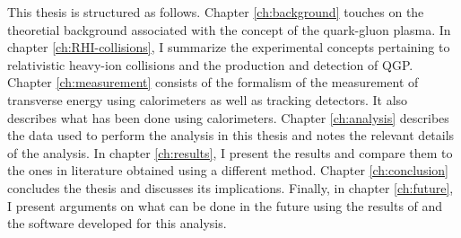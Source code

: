 This thesis is structured as follows. Chapter \ref{ch:background} touches on the theoretial background associated with the concept of the quark-gluon plasma. In chapter \ref{ch:RHI-collisions}, I summarize the experimental concepts pertaining to relativistic heavy-ion collisions and the production and detection of QGP. Chapter \ref{ch:measurement} consists of the formalism of the measurement of transverse energy using calorimeters as well as tracking detectors. It also describes what has been done using calorimeters. Chapter \ref{ch:analysis} describes the data used to perform the analysis in this thesis and notes the relevant details of the analysis. In chapter \ref{ch:results}, I present the results and compare them to the ones in literature obtained using a different method. Chapter \ref{ch:conclusion} concludes the thesis and discusses its implications. Finally, in chapter \ref{ch:future}, I present arguments on what can be done in the future using the results of and the software developed for this analysis.
